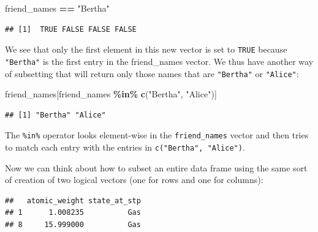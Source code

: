 \documentclass[]{tufte-book}
\newenvironment{Shaded}{\begin{snugshade}}{\end{snugshade}}
\newcommand{\FunctionTok}[1]{\textcolor[rgb]{0.13,0.29,0.53}{\textbf{#1}}}
\newcommand{\NormalTok}[1]{#1}
\newcommand{\SpecialCharTok}[1]{\textcolor[rgb]{0.81,0.36,0.00}{\textbf{#1}}}
\newcommand{\StringTok}[1]{\textcolor[rgb]{0.31,0.60,0.02}{#1}}
\begin{document}
\begin{Shaded}
\begin{Highlighting}[]
\NormalTok{friend\_names }\SpecialCharTok{==} \StringTok{"Bertha"}
\end{Highlighting}
\end{Shaded}

\begin{verbatim}
## [1]  TRUE FALSE FALSE FALSE
\end{verbatim}

We see that only the first element in this new vector is set to \texttt{TRUE} because \texttt{"Bertha"} is the first entry in the friend\_names vector. We thus have another way of subsetting that will return only those names that are \texttt{"Bertha"} or \texttt{"Alice"}:

\begin{Shaded}
\begin{Highlighting}[]
\NormalTok{friend\_names[friend\_names }\SpecialCharTok{\%in\%} \FunctionTok{c}\NormalTok{(}\StringTok{"Bertha"}\NormalTok{, }\StringTok{"Alice"}\NormalTok{)]}
\end{Highlighting}
\end{Shaded}

\begin{verbatim}
## [1] "Bertha" "Alice"
\end{verbatim}

The \texttt{\%in\%} operator looks element-wise in the \texttt{friend\_names} vector and then tries to match each entry with the entries in \texttt{c("Bertha",\ "Alice")}.

Now we can think about how to subset an entire data frame using the same sort of creation of two logical vectors (one for rows and one for columns):

\begin{Shaded}
\end{Shaded}

\begin{verbatim}
##   atomic_weight state_at_stp
## 1      1.008235          Gas
## 8     15.999000          Gas
\end{verbatim}
\end{document}
